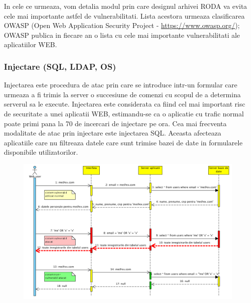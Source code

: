 In cele ce urmeaza, vom detalia modul prin
care designul arhivei RODA va evita cele mai importante astfel de vulnerabilitati. 
Lista acestora urmeaza clasificarea
OWASP (Open Web Application Security Project -
\href{https://www.owasp.org/}{https://www.owasp.org/});
OWASP publica in fiecare an o lista cu cele mai importante vulnerabilitati ale aplicatiilor WEB.

\subsubsection{Injectare (SQL, LDAP, OS) }

Injectarea este procedura de atac prin care se introduce intr-un formular care urmeaza a fi trimis la server o
succesiune de comenzi cu scopul de a determina serverul sa le execute. Injectarea este considerata ca fiind cel mai
important risc de securitate a unei aplicatii WEB, estimandu-se ca o aplicatie cu trafic normal poate primi pana la 70
de incercari de injectare pe ora. Cea mai frecventa modalitate de atac prin injectare este injectarea SQL. Aceasta
afecteaza aplicatiile care nu filtreaza datele care sunt trimise bazei de date in formularele disponibile
utilizatorilor.

\begin{figure}[hbt]
\centering
\includegraphics[width=\textwidth]{SecuritateaarhiveiRODA-img003.png} 
\label{fig:img003}
\end{figure}

